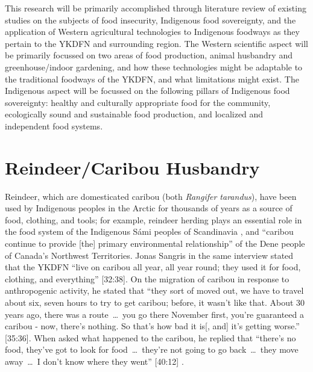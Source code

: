 \documentclass{report}
\begin{document}



\hspace{24pt} This research will be primarily accomplished through literature review of existing studies on the subjects of food insecurity, Indigenous food sovereignty, and the application of Western agricultural technologies to Indigenous foodways as they pertain to the YKDFN and surrounding region.
The Western scientific aspect will be primarily focussed on two areas of food production, animal husbandry and greenhouse/indoor gardening, and how these technologies might be adaptable to the traditional foodways of the YKDFN, and what limitations might exist.
The Indigenous aspect will be focussed on the following pillars of Indigenous food sovereignty: healthy and culturally appropriate food for the community, ecologically sound and sustainable food production, and localized and independent food systems.

\section{Reindeer/Caribou Husbandry}

\hspace{24pt} Reindeer, which are domesticated caribou (both \textit{Rangifer tarandus}), have been used by Indigenous peoples in the Arctic for thousands of years as a source of food, clothing, and tools; for example, reindeer herding plays an essential role in the food system of the Indigenous S\'ami peoples of Scandinavia \parencite{traditionalsiberia}, and ``caribou continue to provide [the] primary environmental relationship'' \parencite[225]{denefoodwaysontologies} of the Dene people of Canada's Northwest Territories. 
Jonas Sangris in the same interview stated that the YKDFN ``live on caribou all year, all year round; they used it for food, clothing, and everything'' [32:38].
On the migration of caribou in response to anthropogenic activity, he stated that ``they sort of moved out, we have to travel about six, seven hours to try to get caribou; before, it wasn't like that. About 30 years ago, there was a route~\ldots~you go there November first, you're guaranteed a caribou - now, there's nothing. So that's how bad it is[, and] it's getting worse.'' [35:36]. 
When asked what happened to the caribou, he replied that ``there's no food, they've got to look for food~\ldots~they're not going to go back~\ldots~they move away~\ldots~I don't know where they went'' [40:12] \parencite{jonassangris}.
\end{document}
